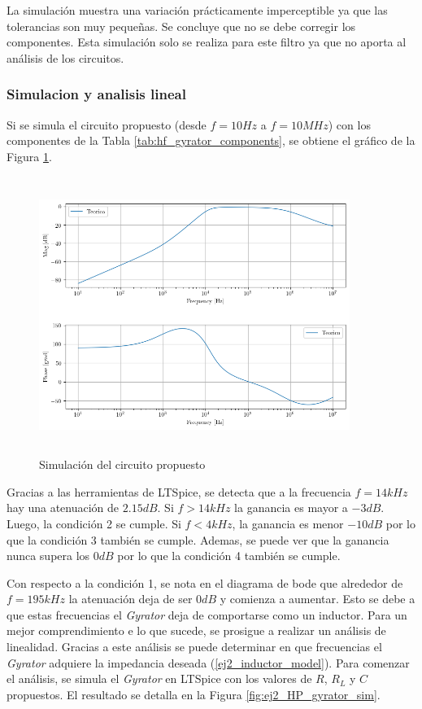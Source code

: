 La simulación muestra una variación prácticamente imperceptible ya que las tolerancias son muy pequeñas. Se concluye que no se debe corregir los componentes. Esta simulación solo se realiza para este filtro ya que no aporta al análisis de los circuitos. 

\subsubsection{Simulacion y analisis lineal}
Si se simula el circuito propuesto (desde $f = 10 Hz$ a $f = 10MHz$) con los componentes de la Tabla \ref{tab:hf_gyrator_components}, se obtiene el gráfico de la Figura \ref{ej2_hp_sim}.

\begin{figure}[h!]                                                       
    \centering\includegraphics[width=0.9\textwidth, height=9cm]{../Ex2/Resources/ej2_hp_sim.png}
    \caption{Simulación del circuito propuesto }
    \label{ej2_hp_sim}
    \end{figure}

Gracias a las herramientas de LTSpice, se detecta que a la frecuencia $f = 14kHz$ hay una atenuación de $2.15 dB$. Si $f > 14kHz$ la ganancia es mayor a $-3dB$. Luego, la condición 2 se cumple. Si $f < 4kHz$, la ganancia es menor $-10dB$ por lo que la condición 3 también se cumple. Ademas, se puede ver que la ganancia nunca supera los $0dB$ por lo que la condición 4 también se cumple. 

Con respecto a la condición 1, se nota en el diagrama de bode que alrededor de $f = 195 kHz$ la atenuación deja de ser $0dB$ y comienza a aumentar. Esto se debe a que estas frecuencias el \textit{Gyrator} deja de comportarse como un inductor. Para un mejor comprendimiento e lo que sucede, se prosigue a realizar un análisis de linealidad. Gracias a este análisis se puede determinar en que frecuencias el \textit{Gyrator} adquiere la impedancia deseada (\ref{ej2_inductor_model}). Para comenzar el análisis, se simula el \textit{Gyrator} en LTSpice con los valores de $R$, $R_L$ y $C$ propuestos. El resultado se detalla en la Figura \ref{fig:ej2_HP_gyrator_sim}.

